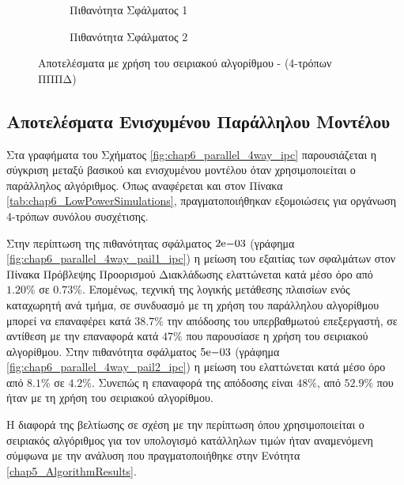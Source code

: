 \begin{figure}[!t]
    \centering
    \begin{subfigure}[t]{\textwidth}
        \centering
        \caption{Πιθανότητα Σφάλματος 1}
        \label{fig:chap6_serial_4way_pail1_ipc}
    \end{subfigure}
    
    \begin{subfigure}[t]{\textwidth}
        \centering
        \caption{Πιθανότητα Σφάλματος 2}
        \label{fig:chap6_serial_4way_pail2_ipc}
    \end{subfigure}
    \caption{Αποτελέσματα με χρήση του σειριακού αλγορίθμου - (4-τρόπων ΠΠΠΔ)}
    \label{fig:chap6_serial_4way_ipc}
\end{figure}


\subsection{Αποτελέσματα Ενισχυμένου Παράλληλου Μοντέλου}
\label{chap6_gem5ParallelAlgResults}

Στα γραφήματα του Σχήματος \ref{fig:chap6_parallel_4way_ipc} παρουσιάζεται η σύγκριση μεταξύ βασικού και ενισχυμένου μοντέλου όταν χρησιμοποιείται ο παράλληλος αλγόριθμος. Όπως αναφέρεται και στον Πίνακα \ref{tab:chap6_LowPowerSimulations}, πραγματοποιήθηκαν εξομοιώσεις για οργάνωση 4-τρόπων συνόλου συσχέτισης.
\par
Στην περίπτωση της πιθανότητας σφάλματος $2\mathrm{e}{-03}$ (γράφημα \ref{fig:chap6_parallel_4way_pail1_ipc}) η μείωση του \ipc εξαιτίας των σφαλμάτων στον Πίνακα Πρόβλεψης Προορισμού Διακλάδωσης ελαττώνεται κατά μέσο όρο από $1.20\%$ σε $0.73\%$. Επομένως, τεχνική της λογικής μετάθεσης πλαισίων ενός καταχωρητή ανά τμήμα, σε συνδυασμό με τη χρήση του παράλληλου αλγορίθμου μπορεί να επαναφέρει κατά $38.7\%$ την απόδοσης του υπερβαθμωτού επεξεργαστή, σε αντίθεση με την επαναφορά κατά $47\%$ που παρουσίασε η χρήση του σειριακού αλγορίθμου. Στην πιθανότητα σφάλματος $5\mathrm{e}{-03}$ (γράφημα \ref{fig:chap6_parallel_4way_pail2_ipc}) η μείωση του \ipc ελαττώνεται κατά μέσο όρο από $8.1\%$ σε $4.2\%$. Συνεπώς η επαναφορά της απόδοσης είναι $48\%$, από $52.9\%$ που ήταν με τη χρήση του σειριακού αλγορίθμου.
\par
Η διαφορά της βελτίωσης σε σχέση με την περίπτωση όπου χρησιμοποιείται ο σειριακός αλγόριθμος για τον υπολογισμό κατάλληλων τιμών ήταν αναμενόμενη σύμφωνα με την ανάλυση που πραγματοποιήθηκε στην Ενότητα \ref{chap5_AlgorithmResults}.

